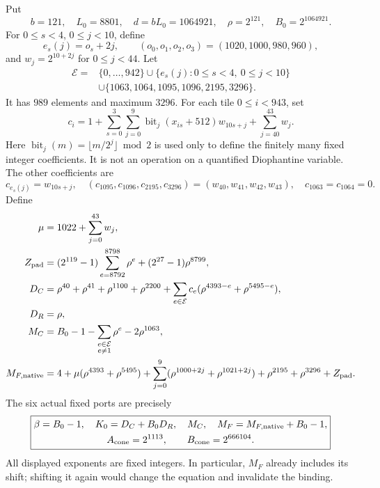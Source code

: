 Put
\[
b=121,\quad L_0=8801,\quad d=bL_0=1064921,\quad
\rho=2^{121},\quad B_0=2^{1064921}.
\]
For \(0\le s<4\), \(0\le j<10\), define
\[
e_s(j)=o_s+2j,\qquad(o_0,o_1,o_2,o_3)=(1020,1000,980,960),
\]
and \(w_j=2^{10+2j}\) for \(0\le j<44\). Let
\[
\begin{split}
\mathcal E={}&\{0,\ldots,942\}
 \cup\{e_s(j):0\le s<4,\ 0\le j<10\}\\
 &\cup\{1063,1064,1095,1096,2195,3296\}.
\end{split}
\]
It has \(989\) elements and maximum \(3296\).
For each tile \(0\le i<943\), set
\[
c_i=1+\sum_{s=0}^3\sum_{j=0}^9
       \operatorname{bit}_j(x_{is}+512)w_{10s+j}
       +\sum_{j=40}^{43}w_j .
\]
Here \(\operatorname{bit}_j(m)=\lfloor m/2^j\rfloor\bmod2\)
is used only to define the finitely many fixed integer coefficients.
It is not an operation on a quantified Diophantine variable.
The other coefficients are
\[
c_{e_s(j)}=w_{10s+j},\quad
(c_{1095},c_{1096},c_{2195},c_{3296})=(w_{40},w_{41},w_{42},w_{43}),
\quad c_{1063}=c_{1064}=0.
\]
Define
\begin{align*}
\mu&=1022+\sum_{j=0}^{43}w_j,\\
Z_{\rm pad}&=(2^{119}-1)\sum_{e=8792}^{8798}\rho^e
                +(2^{27}-1)\rho^{8799},\\
D_C&=\rho^{40}+\rho^{41}+\rho^{1100}+\rho^{2200}
       +\sum_{e\in\mathcal E}c_e(\rho^{4393-e}+\rho^{5495-e}),\\
D_R&=\rho,\\
M_C&=B_0-1-\sum_{\substack{e\in\mathcal E\\e\ne1}}\rho^e
                   -2\rho^{1063},\\
M_{F,\rm native}
 &=4+\mu(\rho^{4393}+\rho^{5495})
     +\sum_{j=0}^9(\rho^{1000+2j}+\rho^{1021+2j})
     +\rho^{2195}+\rho^{3296}+Z_{\rm pad}.
\end{align*}
The six actual fixed ports are precisely
\[
\boxed{\begin{gathered}
\beta=B_0-1,\quad K_0=D_C+B_0D_R,\quad M_C,\quad
M_F=M_{F,\rm native}+B_0-1,\\
A_{\rm cone}=2^{1113},\qquad B_{\rm cone}=2^{666104}.
\end{gathered}}
\]
All displayed exponents are fixed integers. In particular,
\(M_F\) already includes its shift; shifting it again would change
the equation and invalidate the binding.

